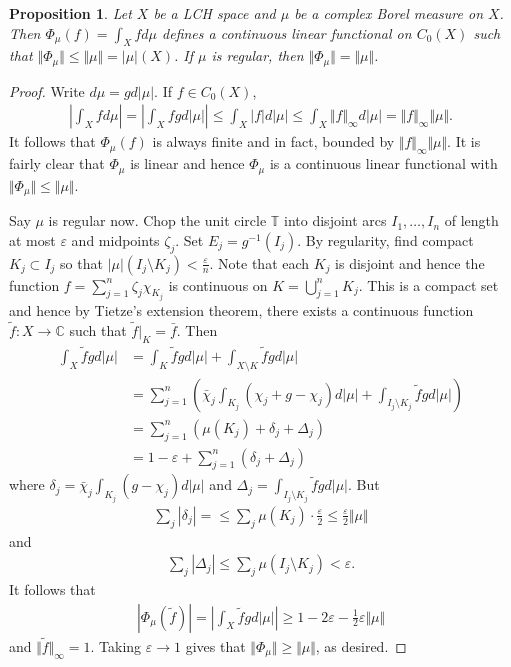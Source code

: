 \documentclass[11pt]{amsart}
\newtheorem{proposition}[theorem]{Proposition}
\theoremstyle{definition}
\numberwithin{equation}{section}
\begin{document}
\begin{proposition}
    Let $X$ be a LCH space and $\mu$ be a complex Borel measure on $X$. Then $\Phi_\mu(f)=\int_Xfd\mu$ defines a continuous linear functional on $C_0(X)$ such that $\Vert\Phi_\mu\Vert\le\Vert\mu\Vert=|\mu|(X)$. If $\mu$ is regular, then $\Vert\Phi_\mu\Vert=\Vert\mu\Vert$.
\end{proposition}
\begin{proof}
    Write $d\mu=gd|\mu|$. If $f\in C_0(X)$, 
    \begin{align*}
        \left|\int_Xfd\mu\right|=\left|\int_Xfgd|\mu|\right|\le\int_X|f|d|\mu|\le\int_X\Vert f\Vert_\infty d|\mu|=\Vert f\Vert_\infty\Vert\mu\Vert.
    \end{align*}
    It follows that $\Phi_\mu(f)$ is always finite and in fact, bounded by $\Vert f\Vert_\infty\Vert\mu\Vert$. It is fairly clear that $\Phi_\mu$ is linear and hence $\Phi_\mu$ is a continuous linear functional with $\Vert\Phi_\mu\Vert\le\Vert\mu\Vert$.

    Say $\mu$ is regular now. Chop the unit circle $\mathbb T$ into disjoint arcs $I_1,\ldots,I_n$ of length at most $\varepsilon$ and midpoints $\zeta_j$. Set $E_j=g^{-1}(I_j)$. By regularity, find compact $K_j\subset I_j$ so that $|\mu|(I_j\setminus K_j)<\frac{\varepsilon}{n}$. Note that each $K_j$ is disjoint and hence the function $f=\sum_{j=1}^n\zeta_j\chi_{K_j}$ is continuous on $K=\bigcup_{j=1}^nK_j$. This is a compact set and hence by Tietze's extension theorem, there exists a continuous function $\tilde f:X\to\mathbb C$ such that $\tilde f|_K=\bar f$. Then
    \begin{align*}
        \int_X\tilde fgd|\mu|&=\int_K\tilde fgd|\mu|+\int_{X\setminus K}\tilde fgd|\mu|\\
        &=\sum_{j=1}^n\left(\bar\chi_j\int_{K_j}(\chi_j+g-\chi_j)d|\mu|+\int_{I_j\setminus K_j}\tilde fgd|\mu|\right)\\
        &=\sum_{j=1}^n\left(\mu(K_j)+\delta_j+\Delta_j\right)\\
        &=1-\varepsilon+\sum_{j=1}^n(\delta_j+\Delta_j)
    \end{align*}
    where $\delta_j=\bar \chi_j\int_{K_j}(g-\chi_j)d|\mu|$ and $\Delta_j=\int_{I_j\setminus K_j}\tilde fgd|\mu|$. But
    \begin{align*}
        \sum_j|\delta_j|=\le\sum_j\mu(K_j)\cdot\frac{\varepsilon}{2}\le\frac{\varepsilon}{2}\Vert\mu\Vert
    \end{align*}
    and 
    \begin{align*}
        \sum_j|\Delta_j|\le \sum_j\mu(I_j\setminus K_j)<\varepsilon.
    \end{align*}
    It follows that
    \begin{align*}
        |\Phi_\mu(\tilde f)|=\left|\int_X\tilde fgd|\mu|\right|\ge1-2\varepsilon-\frac{1}{2}\varepsilon\Vert\mu\Vert
    \end{align*}
    and $\Vert \tilde f\Vert_\infty=1$. Taking $\varepsilon\to 1$ gives that $\Vert\Phi_\mu\Vert\ge\Vert\mu\Vert$, as desired.
\end{proof}
\end{document}
